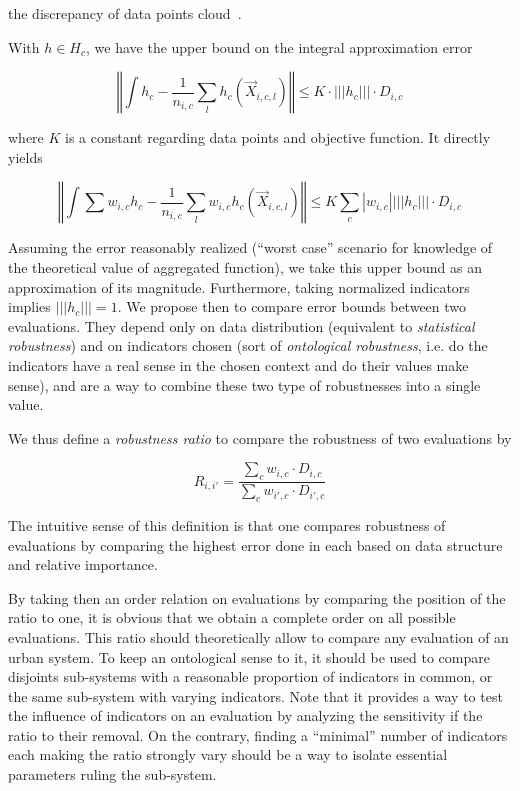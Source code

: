 \documentclass[runningheads,a4paper]{llncs2e/llncs}
\begin{document}
the discrepancy of data points cloud~\cite{niederreiter1972discrepancy}.

With $h\in H_{c}$, we have the upper bound on the integral approximation error

\[
\left\Vert \int h_{c}-\frac{1}{n_{i,c}}\sum_{l}h_{c}(\vec{X}_{i,c,l})\right\Vert \leq K\cdot\left|\left|\left|h_{c}\right|\right|\right|\cdot D_{i,c}
\]

where $K$ is a constant regarding data points and objective function. It directly yields

\[
\left\Vert \int\sum w_{i,c}h_{c}-\frac{1}{n_{i,c}}\sum_{l}w_{i,c}h_{c}(\vec{X}_{i,c,l})\right\Vert \leq K\sum_{c}\left|w_{i,c}\right|\left|\left|\left|h_{c}\right|\right|\right|\cdot D_{i,c}
\]

Assuming the error reasonably realized (``worst case'' scenario for knowledge of the theoretical value of aggregated function), we take this upper bound as an approximation of its magnitude. Furthermore, taking normalized indicators implies $\left|\left|\left|h_c\right|\right|\right| = 1$. We propose then to compare error bounds between two evaluations. They depend only on data distribution (equivalent to \emph{statistical robustness}) and on indicators chosen (sort of \emph{ontological robustness}, i.e. do the indicators have a real sense in the chosen context and do their values make sense), and are a way to combine these two type of robustnesses into a single value.

We thus define a \emph{robustness ratio} to compare the robustness of two evaluations by

\begin{equation}
R_{i,i'}=\frac{\sum_{c}w_{i,c}\cdot D_{i,c}}{\sum_{c}w_{i',c}\cdot D_{i',c}}
\end{equation}


The intuitive sense of this definition is that one compares robustness of evaluations by comparing the highest error done in each based on data structure and relative importance.


By taking then an order relation on evaluations by comparing the position of the ratio to one, it is obvious that we obtain a complete order on all possible evaluations. This ratio should theoretically allow to compare any evaluation of an urban system. To keep an ontological sense to it, it should be used to compare disjoints sub-systems with a reasonable proportion of indicators in common, or the same sub-system with varying indicators. Note that it provides a way to test the influence of indicators on an evaluation by analyzing the sensitivity if the ratio to their removal. On the contrary, finding a ``minimal'' number of indicators each making the ratio strongly vary should be a way to isolate essential parameters ruling the sub-system.
\end{document}

